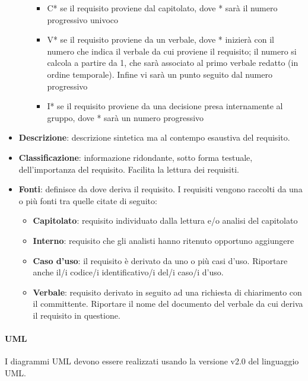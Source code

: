 \begin{itemize}
\begin{itemize}
\begin{itemize}
			\item C* se il requisito proviene dal capitolato, dove * sarà il numero progressivo univoco
			\item V* se il requisito proviene da un verbale, dove * inizierà con il numero che indica il verbale da cui proviene il requisito; il numero si calcola a partire da 1, che sarà associato al primo verbale redatto (in ordine temporale). Infine vi sarà un punto seguito dal numero progressivo
			\item I* se il requisito proviene da una decisione presa internamente al gruppo, dove * sarà un numero progressivo
		\end{itemize}
\end{itemize}
	\item \textbf{Descrizione}: descrizione sintetica ma al contempo esaustiva del requisito.
	\item \textbf{Classificazione}: informazione ridondante, sotto forma testuale, dell’importanza del requisito. Facilita la lettura dei requisiti.
	\item \textbf{Fonti}: definisce da dove deriva il requisito. I requisiti vengono raccolti da una o più fonti tra quelle citate di seguito:
	\begin{itemize}
		\item \textbf{Capitolato}: requisito individuato dalla lettura e/o analisi del capitolato
		\item \textbf{Interno}: requisito che gli analisti hanno ritenuto opportuno aggiungere
		\item \textbf{Caso d’uso}: il requisito è derivato da uno o più casi d’uso. Riportare anche il/i codice/i identificativo/i del/i caso/i d’uso.
		\item \textbf{Verbale}: requisito derivato in seguito ad una richiesta di chiarimento con il committente. Riportare il nome del documento del verbale da cui deriva il requisito in questione.		
	\end{itemize}
\end{itemize}
\paragraph{UML}
I diagrammi UML devono essere realizzati usando la versione v2.0 del linguaggio UML.



